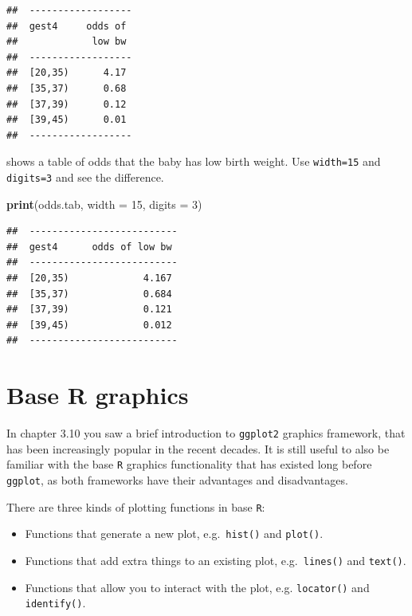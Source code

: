 \documentclass[
]{book}
\newenvironment{Shaded}{\begin{snugshade}}{\end{snugshade}}
\newcommand{\AttributeTok}[1]{\textcolor[rgb]{0.13,0.29,0.53}{#1}}
\newcommand{\DecValTok}[1]{\textcolor[rgb]{0.00,0.00,0.81}{#1}}
\newcommand{\FunctionTok}[1]{\textcolor[rgb]{0.13,0.29,0.53}{\textbf{#1}}}
\newcommand{\NormalTok}[1]{#1}
\providecommand{\tightlist}{%
  \setlength{\itemsep}{0pt}\setlength{\parskip}{0pt}}
\theoremstyle{definition}
\theoremstyle{definition}
\theoremstyle{definition}
\theoremstyle{definition}
\theoremstyle{remark}
\begin{document}
\begin{verbatim}
##  ------------------ 
##  gest4     odds of  
##             low bw  
##  ------------------ 
##  [20,35)      4.17  
##  [35,37)      0.68  
##  [37,39)      0.12  
##  [39,45)      0.01  
##  ------------------
\end{verbatim}

shows a table of odds that the baby has low birth weight. Use
\texttt{width=15} and \texttt{digits=3} and see the difference.

\begin{Shaded}
\begin{Highlighting}[]
\FunctionTok{print}\NormalTok{(odds.tab, }\AttributeTok{width =} \DecValTok{15}\NormalTok{, }\AttributeTok{digits =} \DecValTok{3}\NormalTok{)}
\end{Highlighting}
\end{Shaded}

\begin{verbatim}
##  -------------------------- 
##  gest4      odds of low bw  
##  -------------------------- 
##  [20,35)             4.167  
##  [35,37)             0.684  
##  [37,39)             0.121  
##  [39,45)             0.012  
##  --------------------------
\end{verbatim}

\chapter{Base R graphics}\label{base-r-graphics}

In chapter 3.10 you saw a brief introduction to \texttt{ggplot2} graphics framework, that has been increasingly popular in the recent decades. It is still useful to also be familiar with the base \texttt{R} graphics functionality that has existed long before \texttt{ggplot}, as both frameworks have their advantages and disadvantages.

There are three kinds of plotting functions in base \texttt{R}:

\begin{itemize}
\tightlist
\item
  Functions that generate a new plot, e.g.~\texttt{hist()} and
  \texttt{plot()}.
\item
  Functions that add extra things to an existing plot,
  e.g.~\texttt{lines()} and \texttt{text()}.
\item
  Functions that allow you to interact with the plot, e.g.
  \texttt{locator()} and \texttt{identify()}.
\end{itemize}
\end{document}
